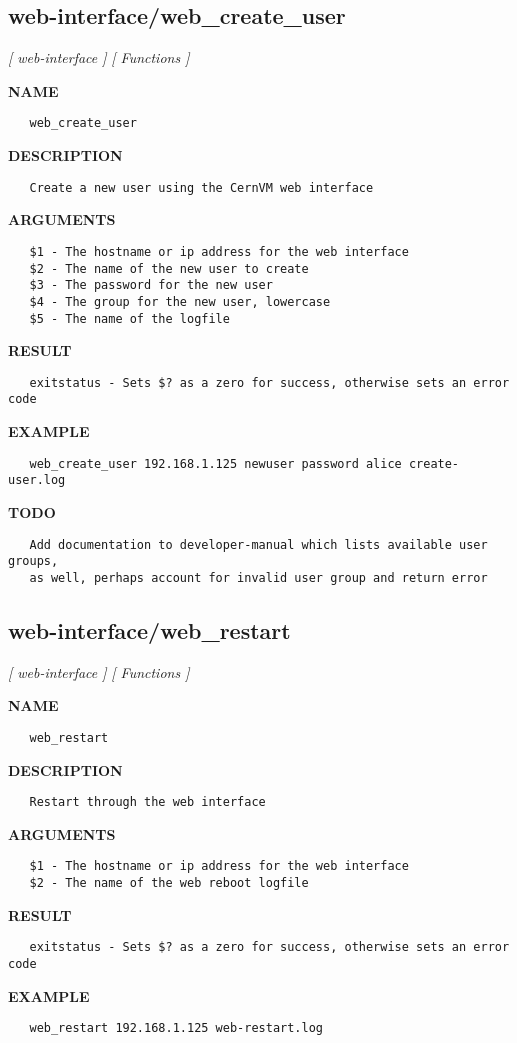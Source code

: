 \subsection{web-interface/web\_create\_user}
\textsl{[ web-interface ]}
\textsl{[ Functions ]}

\label{ch:robo52}
\label{ch:web_interface_web_create_user}
\textbf{NAME}
\begin{verbatim}
   web_create_user
\end{verbatim}
\textbf{DESCRIPTION}
\begin{verbatim}
   Create a new user using the CernVM web interface
\end{verbatim}
\textbf{ARGUMENTS}
\begin{verbatim}
   $1 - The hostname or ip address for the web interface
   $2 - The name of the new user to create
   $3 - The password for the new user
   $4 - The group for the new user, lowercase
   $5 - The name of the logfile
\end{verbatim}
\textbf{RESULT}
\begin{verbatim}
   exitstatus - Sets $? as a zero for success, otherwise sets an error code
\end{verbatim}
\textbf{EXAMPLE}
\begin{verbatim}
   web_create_user 192.168.1.125 newuser password alice create-user.log
\end{verbatim}
\textbf{TODO}
\begin{verbatim}
   Add documentation to developer-manual which lists available user groups,
   as well, perhaps account for invalid user group and return error
\end{verbatim}
\newpage
\subsection{web-interface/web\_restart}
\textsl{[ web-interface ]}
\textsl{[ Functions ]}

\label{ch:robo53}
\label{ch:web_interface_web_restart}
\textbf{NAME}
\begin{verbatim}
   web_restart
\end{verbatim}
\textbf{DESCRIPTION}
\begin{verbatim}
   Restart through the web interface
\end{verbatim}
\textbf{ARGUMENTS}
\begin{verbatim}
   $1 - The hostname or ip address for the web interface
   $2 - The name of the web reboot logfile
\end{verbatim}
\textbf{RESULT}
\begin{verbatim}
   exitstatus - Sets $? as a zero for success, otherwise sets an error code
\end{verbatim}
\textbf{EXAMPLE}
\begin{verbatim}
   web_restart 192.168.1.125 web-restart.log
\end{verbatim}
\newpage
